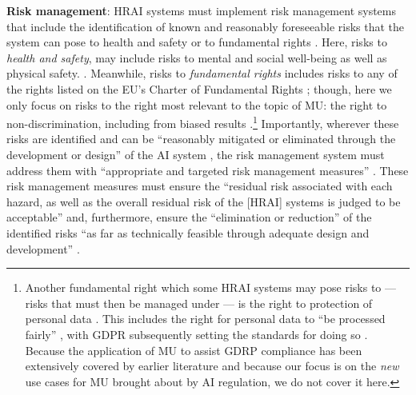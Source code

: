 \textbf{Risk management}:
HRAI systems must implement risk management systems that include the identification of known and reasonably foreseeable risks that the system can pose to health and safety or to fundamental rights \citep[Art. 9.2(a)]{european_union_ai_act_2024, kaminski_law_review_2023}. Here, risks to \textit{health and safety}, may include risks to mental and social well-being as well as physical safety. \citep{armstrong_ai_safety_2024, european_commission_ai_qa_2021}. Meanwhile, risks to \textit{fundamental rights} includes risks to any of the rights listed on the EU's Charter of Fundamental Rights \citep{eu_charter_2000}; though, here we only focus on risks to the right most relevant to the topic of MU: the right to non-discrimination, including from biased results \citep{arnold_how_2024}.\footnote{Another fundamental right which some HRAI systems may pose risks to --- risks that must then be managed under \citep[Art. 9]{european_union_ai_act_2024} --- is the right to protection of personal data \citep[Art. 8]{eu_charter_2000}. This includes the right for personal data to ``be processed fairly'' \citep[Art. 8(2)]{eu_charter_2000}, with GDPR subsequently setting the standards for doing so \citep{european_union_gdpr_2016}. Because the application of MU to assist GDRP compliance has been extensively covered by earlier literature \citep{JULIUSSEN2023105885,yang2024machinelearningmachineunlearning} and because our focus is on the \textit{new} use cases for MU brought about by AI regulation, we do not cover it here.}
Importantly, wherever these risks are identified and can be ``reasonably mitigated or eliminated through the development or design'' of the AI system \citep[Art. 9.3]{european_union_ai_act_2024}, the risk management system must address them with ``appropriate and targeted risk management measures'' \citep[Art. 9.2(d)]{european_union_ai_act_2024}. 
These risk management measures must ensure the ``residual risk associated with each hazard, as well as the overall residual risk of the [HRAI] systems is judged to be acceptable'' \citep[Art. 9.5]{european_union_ai_act_2024} and, furthermore, ensure the ``elimination or reduction'' of the identified risks ``as far as technically feasible through adequate design and development''  \citep[Art. 9.5]{european_union_ai_act_2024}.


